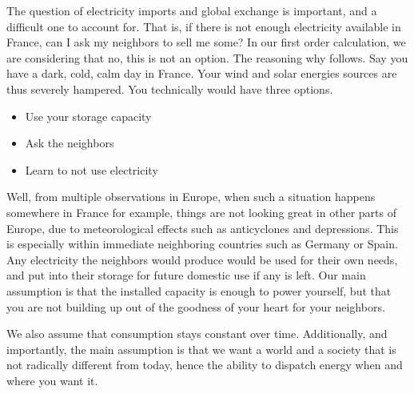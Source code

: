 The question of electricity imports and global exchange is important, and a difficult one to account for. That is, if there is not enough electricity available in France, can I ask my neighbors to sell me some? In our first order calculation, we are considering that no, this is not an option. The reasoning why follows. Say you have a dark, cold, calm day in France. Your wind and solar energies sources are thus severely hampered. You technically would have three options.

\begin{itemize}
	\item Use your storage capacity
	\item Ask the neighbors
	\item Learn to not use electricity
\end{itemize}


Well, from multiple observations in Europe, when such a situation happens somewhere in France for example, things are not looking great in other parts of Europe, due to meteorological effects such as anticyclones and depressions. This is especially within immediate neighboring countries such as Germany or Spain. Any electricity the neighbors would produce would be used for their own needs, and put into their storage for future domestic use if any is left. Our main assumption is that the installed capacity is enough to power yourself, but that you are not building up out of the goodness of your heart for your neighbors.

We also assume that consumption stays constant over time. Additionally, and importantly, the main assumption is that we want a world and a society that is not radically different from today, hence the ability to dispatch energy when and where you want it.

